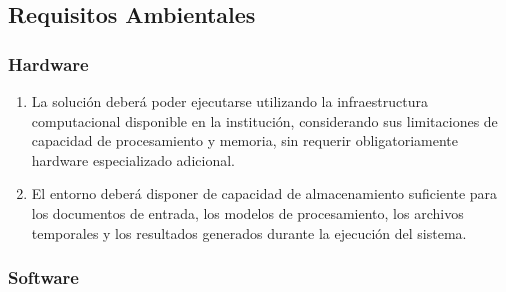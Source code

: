 \subsection{Requisitos Ambientales}


\subsubsection{Hardware}

\begin{enumerate}

    \item[\textbf{RA-H01}] La solución deberá poder ejecutarse utilizando la infraestructura computacional disponible en la institución, considerando sus limitaciones de capacidad de procesamiento y memoria, sin requerir obligatoriamente hardware especializado adicional.

    \item[\textbf{RA-H02}] El entorno deberá disponer de capacidad de almacenamiento suficiente para los documentos de entrada, los modelos de procesamiento, los archivos temporales y los resultados generados durante la ejecución del sistema.

\end{enumerate}

\subsubsection{Software}

